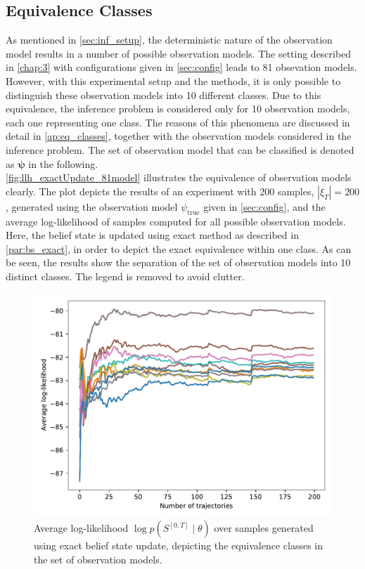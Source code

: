 \subsection{Equivalence Classes}
\label{sec:eq_classes}
As mentioned in \cref{sec:inf_setup}, the deterministic nature of the observation model results in a number of possible observation models. The setting described in \cref{chap:3} with configurations given in \cref{sec:config} leads to 81 obsevation models. However, with this experimental setup and the methods, it is only possible to distinguish these observation models into 10 different classes. Due to this equivalence, the inference problem is considered only for 10 observation models, each one representing one class. The reasons of this phenomena are discussed in detail in \cref{ap:eq_classes}, together with the observation models considered in the inference problem. The set of observation model that can be classified is denoted as $ \symbf{\psi} $ in the following. \\
\autoref{fig:llh_exactUpdate_81model} illustrates the equivalence of observation models clearly. The plot depicts the results of an experiment with 200 samples, $ |\xi_T| = 200 $, generated using the observation model $ \psi_{\text{true}} $ given in \cref{sec:config}, and the average log-likelihood of samples computed for all possible observation models. Here, the belief state is updated using exact method as described in \cref{par:bs_exact}, in order to depict the exact equivalence within one class. As can be seen, the results show the separation of the set of observation models into 10 distinct classes. The legend is removed to avoid clutter.
\begin{figure}[H]
	\begin{center}
		\includegraphics[width=.8\textwidth]{figures/equivalence_classes/llh_exactUpdate_81model}
		\caption[Equivalence classes in the case of exact belief update]{Average log-likelihood $ \log p(S^{[0,T]} \mid \theta) $ over samples generated using exact belief state update, depicting the equivalence classes in the set of observation models.}
		\label{fig:llh_exactUpdate_81model}
	\end{center}
\end{figure}
